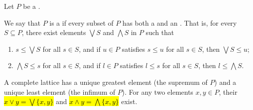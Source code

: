 \begin{definition} \label{definition:complete_lattice}
Let $P$ be a .

We say that $P$ is a  if every subset of $P$ has both a  and an . That is, for every $S \subseteq P$, there exist elements $\bigvee S$ and $\bigwedge S$ in $P$ such that
\begin{enumerate}
    \item $s \leq \bigvee S$ for all $s \in S$, and if $u \in P$ satisfies $s \leq u$ for all $s \in S$, then $\bigvee S \leq u$;
    \item $\bigwedge S \leq s$ for all $s \in S$, and if $l \in P$ satisfies $l \leq s$ for all $s \in S$, then $l \leq \bigwedge S$.
\end{enumerate}

A complete lattice has a unique greatest element (the supremum of $P$) and a unique least element (the infimum of $P$). For any two elements $x, y \in P$, their  \hl{$x \vee y = \bigvee \{x, y\}$} and  \hl{$x \wedge y = \bigwedge \{x, y\}$} exist.
\end{definition}
